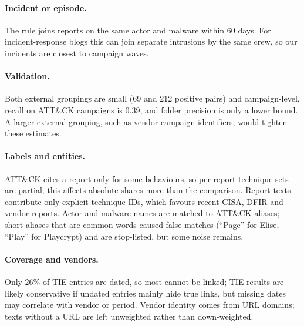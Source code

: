 \documentclass[runningheads]{llncs}
\newcommand{\attack}{ATT\&CK}
\begin{document}
\paragraph{Incident or episode.} The rule joins reports on the same actor and malware within 60 days. For incident-response blogs this can join separate intrusions by the same crew, so our incidents are closest to campaign waves.

\paragraph{Validation.} Both external groupings are small (69 and 212 positive pairs) and campaign-level, recall on \attack{} campaigns is 0.39, and folder precision is only a lower bound. A larger external grouping, such as vendor campaign identifiers, would tighten these estimates.

\paragraph{Labels and entities.} \attack{} cites a report only for some behaviours, so per-report technique sets are partial; this affects absolute shares more than the comparison. Report texts contribute only explicit technique IDs, which favours recent CISA, DFIR and vendor reports. Actor and malware names are matched to \attack{} aliases; short aliases that are common words caused false matches (``Page'' for Elise, ``Play'' for Playcrypt) and are stop-listed, but some noise remains.

\paragraph{Coverage and vendors.} Only 26\% of TIE entries are dated, so most cannot be linked; TIE results are likely conservative if undated entries mainly hide true links, but missing dates may correlate with vendor or period. Vendor identity comes from URL domains; texts without a URL are left unweighted rather than down-weighted.
\end{document}
